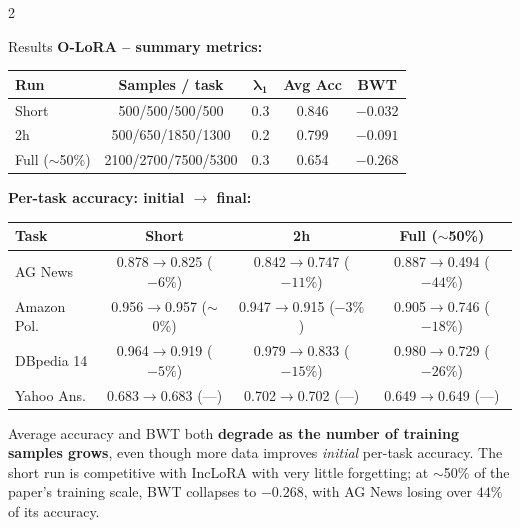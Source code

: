 \documentclass[portrait,a0,final]{a0poster}
\begin{document}
\begin{multicols}{2}
\begin{secbox}{Results}
\smallskip
\textbf{O-LoRA -- summary metrics:}\par\smallskip
\begin{center}\normalsize
\begin{tabular}{lcccc}
\toprule
\textbf{Run} & \textbf{Samples / task} & $\boldsymbol{\lambda_1}$ & \textbf{Avg Acc} & \textbf{BWT}\\
\midrule
Short             & 500/500/500/500     & 0.3 & 0.846 & $-0.032$\\
2h                & 500/650/1850/1300   & 0.2 & 0.799 & $-0.091$\\
Full ($\sim$50\%) & 2100/2700/7500/5300 & 0.3 & 0.654 & $-0.268$\\
\bottomrule
\end{tabular}
\end{center}

\smallskip
\textbf{Per-task accuracy: initial $\rightarrow$ final:}\par\smallskip
\begin{center}\small
\begin{tabular}{lccc}
\toprule
\textbf{Task} & \textbf{Short} & \textbf{2h} & \textbf{Full ($\sim$50\%)}\\
\midrule
AG News        & 0.878$\to$0.825 ($-6\%$)    & 0.842$\to$0.747 ($-11\%$) & 0.887$\to$0.494 ($-44\%$)\\
Amazon Pol.    & 0.956$\to$0.957 ($\sim$0\%) & 0.947$\to$0.915 ($-3\%$)  & 0.905$\to$0.746 ($-18\%$)\\
DBpedia 14     & 0.964$\to$0.919 ($-5\%$)    & 0.979$\to$0.833 ($-15\%$) & 0.980$\to$0.729 ($-26\%$)\\
Yahoo Ans.     & 0.683$\to$0.683 (---)       & 0.702$\to$0.702 (---)     & 0.649$\to$0.649 (---)\\
\bottomrule
\end{tabular}
\end{center}

\smallskip
Average accuracy and BWT both \textbf{degrade as the number of training samples grows},
even though more data improves \emph{initial} per-task accuracy. The short run is
competitive with IncLoRA with very little forgetting; at $\sim$50\% of the paper's training
scale, BWT collapses to $-0.268$, with AG News losing over $44\%$ of its accuracy.
\end{secbox}


\end{multicols}
\end{document}
